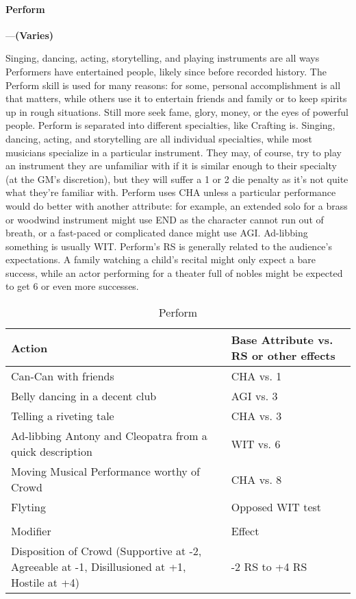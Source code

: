 \documentclass[oneside,11pt,english]{book}
\begin{document}
\paragraph{\label{skill:Perform}Perform}---\quad\textbf{(Varies) }\par
Singing, dancing, acting, storytelling, and playing instruments are all ways Performers have entertained people, likely since before recorded history. The Perform skill is used for many reasons: for some, personal accomplishment is all that matters, while others use it to entertain friends and family or to keep spirits up in rough situations. Still more seek fame, glory, money, or the eyes of powerful people. Perform is separated into different specialties, like Crafting is. Singing, dancing, acting, and storytelling are all individual specialties, while most musicians specialize in a particular instrument. They may, of course, try to play an instrument they are unfamiliar with if it is similar enough to their specialty (at the GM’s discretion), but they will suffer a 1 or 2 die penalty as it’s not quite what they’re familiar with. Perform uses CHA unless a particular performance would do better with another attribute: for example, an extended solo for a brass or woodwind instrument might use END as the character cannot run out of breath, or a fast-paced or complicated dance might use AGI. Ad-libbing something is usually WIT. Perform’s RS is generally related to the audience’s expectations. A family watching a child’s recital might only expect a bare success, while an actor performing for a theater full of nobles might be expected to get 6 or even more successes.


\begin{longtabu} to \linewidth{X[1.5]X[r]}
	\caption{Perform}
	\label{tab:Perform}\\
	\rowfont[c]{}Action &Base Attribute vs. RS or other effects\\\toprule
Can-Can with friends &CHA vs. 1 \\
Belly dancing in a decent club &AGI vs. 3 \\
Telling a riveting tale &CHA vs. 3 \\
Ad-libbing Antony and Cleopatra from a quick description &WIT vs. 6 \\
Moving Musical Performance worthy of Crowd &CHA vs. 8 \\
Flyting &Opposed WIT test \\
	\\
		\rowfont[c]{} Modifier & Effect\\\cmidrule(lr){1-2} 
Disposition of Crowd (Supportive at -2, Agreeable at -1, Disillusioned at +1, Hostile at +4) &-2 RS to +4 RS\\
\end{longtabu}
\end{document}

